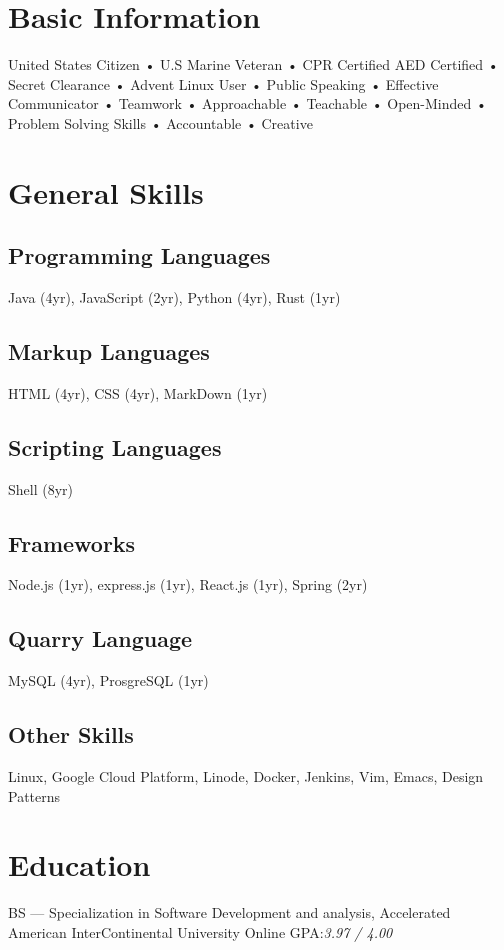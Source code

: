 \documentclass{resume-class/nadario_resume}
\begin{document}
\makecvtitle{}
\section{Basic Information}
\begin{center}
United States Citizen • U.S Marine Veteran • CPR Certified AED Certified • Secret
Clearance • Advent Linux User • Public Speaking • Effective Communicator •
Teamwork • Approachable • Teachable • Open-Minded • Problem Solving Skills • Accountable • Creative
\end{center}

\section{General Skills}
\subsection{Programming Languages}
Java (4yr), JavaScript (2yr), Python (4yr), Rust (1yr)
\subsection{Markup Languages}
HTML (4yr), CSS (4yr), MarkDown (1yr)
\subsection{Scripting Languages}
Shell (8yr)
\subsection{Frameworks}
Node.js (1yr), express.js (1yr), React.js (1yr), Spring (2yr)
\subsection{Quarry Language}
MySQL (4yr), ProsgreSQL (1yr)
\subsection{Other Skills}
Linux, Google Cloud Platform, Linode, Docker, Jenkins, Vim, Emacs, Design
Patterns

\section{Education}
        {BS --- Specialization in Software Development and analysis, Accelerated}
        {American InterContinental University}
        {Online}
        {}{GPA:\textit{3.97 / 4.00}}
        \vspace{.25cm}
\end{document}
